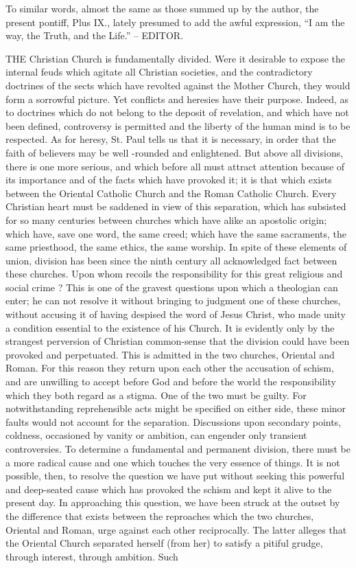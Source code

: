 To similar words, almost the same as those summed up by the author, the present pontiff, Plus IX., lately presumed to add the awful expression, “I am the way, the Truth, and the Life.” – EDITOR.


THE Christian Church is fundamentally divided. Were it desirable to expose the internal feuds which agitate all Christian societies, and the contradictory doctrines of the sects which have revolted against the Mother Church, they would form a sorrowful picture. Yet conflicts and heresies have their purpose. Indeed, as to doctrines which do not belong to the deposit of revelation, and which have not been defined, controversy is permitted and the liberty of the human mind is to be respected. As for heresy, St. Paul tells us that it is necessary, in order that the faith of believers may be well -rounded and enlightened. But above all divisions, there is one more serious, and which before all must attract attention because of its importance and of the facts which have provoked it; it is that which exists between the Oriental Catholic Church and the Roman Catholic Church. Every Christian heart must be saddened in view of this separation, which has subsisted for so many centuries between churches which have alike an apostolic origin; which have, save one word, the same creed; which have the same sacraments, the same priesthood, the same ethics, the same worship. In spite of these elements of union, division has been since the ninth century all acknowledged fact between these churches. Upon whom recoils the responsibility for this great religious and social crime ? This is one of the gravest questions upon which a theologian can enter; he can not resolve it without bringing to judgment one of these churches, without accusing it of having despised the word of Jesus Christ, who made unity a condition essential to the existence of his Church. It is evidently only by the strangest perversion of Christian common-sense that the division could have been provoked and perpetuated. This is admitted in the two churches, Oriental and Roman. For this reason they return upon each other the accusation of schism, and are unwilling to accept before God and before the world the responsibility which they both regard as a stigma. One of the two must be guilty. For notwithstanding reprehensible acts might be specified on either side, these minor faults would not account for the separation. Discussions upon secondary points, coldness, occasioned by vanity or ambition, can engender only transient controversies. To determine a fundamental and permanent division, there must be a more radical cause and one which touches the very essence of things. It is not possible, then, to resolve the question we have put without seeking this powerful and deep-seated cause which has provoked the schism and kept it alive to the present day. In approaching this question, we have been struck at the outset by the difference that exists between the reproaches which the two churches, Oriental and Roman, urge against each other reciprocally. The latter alleges that the Oriental Church separated herself (from her) to satisfy a pitiful grudge, through interest, through ambition. Such 